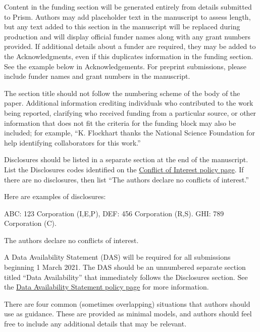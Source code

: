 \documentclass[9pt,twocolumn,twoside]{opticajnl}
\begin{document}
\begin{backmatter}
 Content in the funding section will be generated entirely from details submitted to Prism. Authors may add placeholder text in the manuscript to assess length, but any text added to this section in the manuscript will be replaced during production and will display official funder names along with any grant numbers provided. If additional details about a funder are required, they may be added to the Acknowledgments, even if this duplicates information in the funding section. See the example below in Acknowledgements. For preprint submissions, please include funder names and grant numbers in the manuscript.

 The section title should not follow the numbering scheme of the body of the paper. Additional information crediting individuals who contributed to the work being reported, clarifying who received funding from a particular source, or other information that does not fit the criteria for the funding block may also be included; for example, ``K. Flockhart thanks the National Science Foundation for help identifying collaborators for this work.''

 Disclosures should be listed in a separate section at the end of the manuscript. List the Disclosures codes identified on the \href{https://opg.optica.org/submit/review/conflicts-interest-policy.cfm}{Conflict of Interest policy page}. If there are no disclosures, then list ``The authors declare no conflicts of interest.''

\smallskip

\noindent Here are examples of disclosures:


 ABC: 123 Corporation (I,E,P), DEF: 456 Corporation (R,S). GHI: 789 Corporation (C).

 The authors declare no conflicts of interest.


 A Data Availability Statement (DAS) will be required for all submissions beginning 1 March 2021. The DAS should be an unnumbered separate section titled ``Data Availability'' that
immediately follows the Disclosures section. See the \href{https://opg.optica.org/submit/review/data-availability-policy.cfm}{Data Availability Statement policy page} for more information.

There are four common (sometimes overlapping) situations that authors should use as guidance. These are provided as minimal models, and authors should feel free to
include any additional details that may be relevant.




\end{backmatter}
\end{document}

